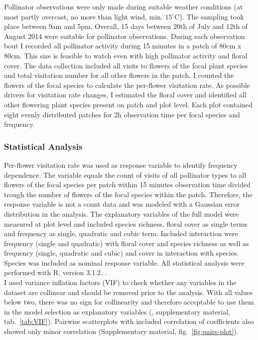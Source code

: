 Pollinator observations were only made during suitable weather conditions (at most partly overcast, no more than light wind, min. $15 ^\circ\text{C}$). The sampling took place between 9am and 5pm. Overall, 15 days between 20th of July and 12th of August 2014 were suitable for pollinator observations. 
During each observation bout I recorded all pollinator activity during 15 minutes in a patch of 80cm x 80cm. This size is feasible to watch even with high pollinator activity and floral cover. The data collection included all visits to flowers of the focal plant species and total visitation number for all other flowers in the patch. I counted the flowers of the focal species to calculate the per-flower visitation rate. As possible drivers for visitation rate changes, I estimated the floral cover and identified all other flowering plant species present on patch and plot level. Each plot contained eight evenly distributed patches for 2h observation time per focal species and frequency. 

\subsubsection*{Statistical Analysis}
Per-flower visitation rate was used as response variable to identify frequency dependence. The variable equals the count of visits of all pollinator types to all flowers of the focal species per patch within 15 minutes observation time divided trough the number of flowers of the focal species within the patch. Therefore, the response variable is not a count data and was modeled with a Gaussian error distribution in the analysis.
The explanatory variables of the full model were measured at plot level and included species richness, floral cover as single terms and frequency as single, quadratic and cubic term. Included interaction were frequency (single and quadratic) with floral cover and species richness as well as frequency (single, quadratic and cubic) and cover in interaction with species. Species was included as nominal response variable. All statistical analysis were performed with R, version 3.1.2. \citep{R}. \\


I used variance inflation factors (VIF) to check whether any variables in the dataset are collinear and should be removed prior to the analysis. With all values below two, there was no sign for collinearity and therefore acceptable to use them in the model selection as explanatory variables (\citealt{zuur2007analysing}, supplementary material, tab.~\ref{tab:VIF}). Pairwise scatterplots with included correlation of coefficients also showed only minor correlation (Supplementary material, fig.~\ref{fig:pairs-plot}).

